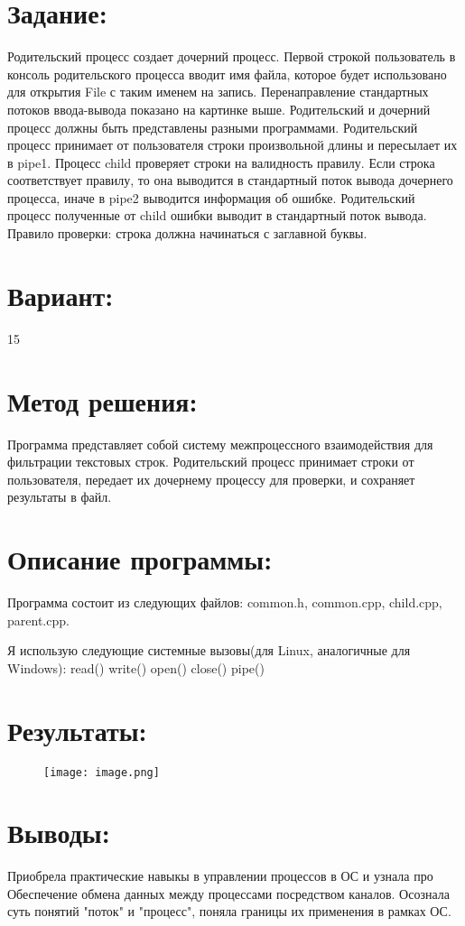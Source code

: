 \documentclass[14pt,a4paper]{extarticle}
\begin{document}
\section*{Задание:}
Родительский процесс создает дочерний процесс. Первой строкой пользователь в консоль родительского процесса вводит имя файла, которое будет использовано для открытия File с таким именем на запись. Перенаправление стандартных потоков ввода-вывода показано на картинке выше. Родительский и дочерний процесс должны быть представлены разными программами. Родительский процесс принимает от пользователя строки произвольной длины и пересылает их в pipe1. Процесс child проверяет строки на валидность правилу. Если строка соответствует правилу, то она выводится в стандартный поток вывода дочернего процесса, иначе в pipe2 выводится информация об ошибке. Родительский процесс полученные от child ошибки выводит в стандартный поток вывода. Правило проверки: строка должна начинаться с заглавной буквы.
\section*{Вариант:}
15

\section*{Метод решения:}
Программа представляет собой систему межпроцессного взаимодействия для фильтрации текстовых строк. Родительский процесс принимает строки от пользователя, передает их дочернему процессу для проверки, и сохраняет результаты в файл.

\section*{Описание программы:}
Программа состоит из следующих файлов: common.h, common.cpp, child.cpp, parent.cpp.

Я использую следующие системные вызовы(для Linux, аналогичные для Windows): 
read()
write()
open()
close()
pipe()

\section*{Результаты:}
\begin{figure}[!ht]
    \centering
    \texttt{[image: image.png]}
\end{figure}
\section*{Выводы:}
Приобрела практические навыкы в управлении процессов в ОС и узнала про Обеспечение обмена данных между процессами посредством каналов. Осознала суть понятий "поток" и "процесс", поняла границы их применения в рамках ОС. 
\newpage
\end{document}
